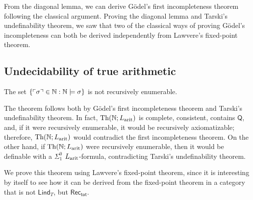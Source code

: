 \begin{remark}
    From the diagonal lemma, we can derive Gödel's first incompleteness theorem following the classical argument.
    Proving the diagonal lemma and Tarski's undefinability theorem, we saw that two of the classical ways of proving Gödel's incompleteness
    can both be derived independently from Lawvere's fixed-point theorem.
\end{remark}

\subsection*{Undecidability of true arithmetic}

\begin{theorem}
    The set $\{\ulcorner \sigma \urcorner \in \mathbb{N} : \mathbb{N} \models \sigma\}$ is not recursively enumerable.
\end{theorem}

\begin{remark}
    The theorem follows both by Gödel's first incompleteness theorem and Tarski's undefinability theorem. In fact, $\mathrm{Th}(\mathbb{N};L_{\textnormal{arit}})$ is complete, consistent, contains $\mathsf{Q}$, and, if it were recursively enumerable, it would be recursively axiomatizable;
    therefore, $\mathrm{Th}(\mathbb{N};L_{\textnormal{arit}})$ would contradict the first incompleteness theorem. On the other hand, if $\mathrm{Th}(\mathbb{N};L_{\textnormal{arit}})$ were recursively enumerable, then it would be definable with a $\Sigma_1^0$ $L_{\textnormal{arit}}$-formula, contradicting Tarski's undefinability theorem.
\end{remark}

We prove this theorem using Lawvere's fixed-point theorem, since it is interesting by itself to see how it can be derived from the fixed-point theorem in a category that is not $\mathsf{Lind}_T$, but $\mathsf{Rec_{tot}}$.

